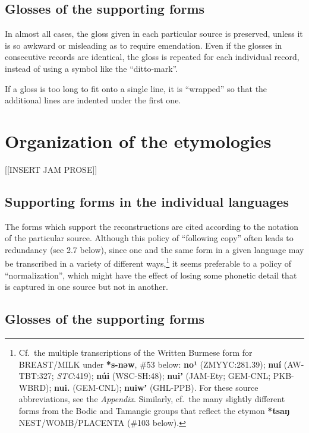\subsection{Glosses of the supporting forms}


In almost all cases, the gloss given in each particular source is preserved,
unless it is so awkward or misleading as to require emendation.  Even if the
glosses in consecutive records are identical, the gloss is repeated for each
individual record, instead of using a symbol like the “ditto-mark”.  


If a gloss is too long to fit onto a single line, it is “wrapped” so that
the additional lines are indented under the first one.


\section{Organization of the etymologies}

[[INSERT JAM PROSE]]

\subsection{Supporting forms in the individual languages}


The forms which support the reconstructions are cited according to the
notation of the particular source.  Although this policy of “following copy”
often leads to redundancy (see 2.7 below), since one and the same form in a
given language may be transcribed in a variety of different ways,\footnote{Cf.\ the
multiple transcriptions of the Written Burmese form for BREAST/MILK under
\textbf{*s-nəw}, \#53 below:  \textbf{no¹}
(ZMYYC:281.39); \textbf{nuí} (AW-TBT:327; \textit{STC}:419); \textbf{núi}
(WSC-SH:48); \textbf{nuiʼ} (JAM-Ety; GEM-CNL; PKB-WBRD);
\textbf{nui.} (GEM-CNL); \textbf{nuiwʼ} (GHL-PPB).
 For these source abbreviations, see the \textit{Appendix}. Similarly, cf.\ the many slightly different forms from the Bodic and Tamangic groups that reflect the etymon \textbf{*tsaŋ} NEST/WOMB/PLACENTA (\#103 below).} it seems preferable to a
policy of “normalization”, which might have the effect of losing some phonetic
detail that is captured in one source but not in another.

\subsection{Glosses of the supporting forms}


